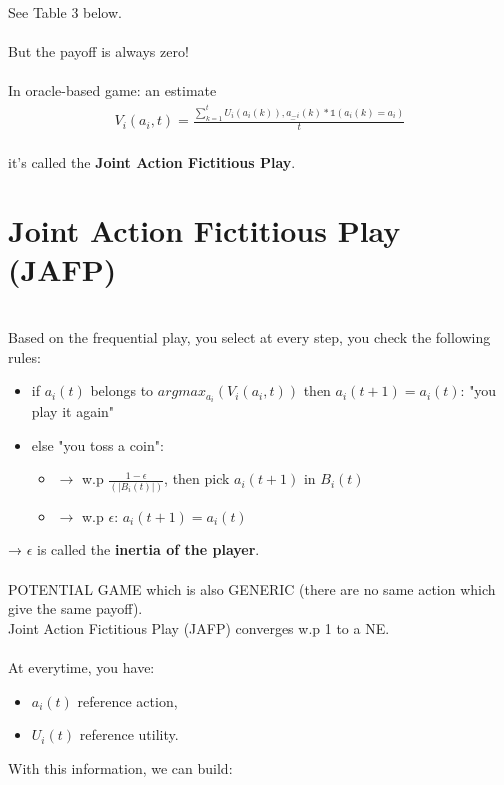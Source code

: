 See Table 3 below.\\
\\
But the payoff is always zero!\\
\\
In oracle-based game: an estimate\\
\begin{equation}\label{eq:14}
\begin{aligned}
V_i(a_i, t) = \frac{\sum_{k = 1}^t U_i(a_i(k)), \underset{-}{a_{-i}}(k) * \mathbb{1}(a_i(k) = a_i)}{t}
\end{aligned}
\end{equation}\\
it's called the \textbf{Joint Action Fictitious Play}.\\
\section{Joint Action Fictitious Play (JAFP)}\\
Based on the frequential play, you select at every step, you check the following rules: \\
\begin{itemize}
\item if $a_i(t)$ belongs to $argmax_{a_i}(V_i(a_i, t))$ then $a_i(t + 1) = a_i(t)$: "you play it again"
\item else "you toss a coin":
    \begin{itemize}
        \item $\rightarrow$ w.p $\frac{1 - \epsilon}{(|B_i(t)|)}$, then pick $a_i(t + 1)$ in $B_i(t)$
	    \item $\rightarrow$ w.p $\epsilon$: $a_i(t + 1) = a_i(t)$
    \end{itemize}
\end{itemize}
→ $\epsilon$ is called the \textbf{inertia of the player}.\\
\\
POTENTIAL GAME which is also GENERIC (there are no same action which give the same payoff).\\
Joint Action Fictitious Play (JAFP) converges w.p 1 to a NE.\\
\\
At everytime, you have:
\begin{itemize}
    \item $a_i(t)$ reference action,
    \item $U_i(t)$ reference utility.
\end{itemize}
With this information, we can build:\\
